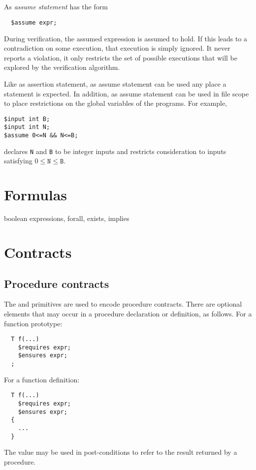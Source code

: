 \subsection{\cassume} As \emph{assume statement} has the form
\begin{verbatim}
  $assume expr;
\end{verbatim}
During verification, the assumed expression is assumed to hold.  If
this leads to a contradiction on some execution, that execution is
simply ignored.  It never reports a violation, it only restricts the
set of possible executions that will be explored by the verification
algorithm.

Like as assertion statement, as assume statement can be used any place
a statement is expected.  In addition, as assume statement can be used
in file scope to place restrictions on the global variables of the
programs.  For example,
\begin{verbatim}
$input int B;
$input int N;
$assume 0<=N && N<=B;
\end{verbatim}
declares \texttt{N} and \texttt{B} to be integer inputs and restricts
consideration to inputs satisfying $0\leq\texttt{N}\leq\texttt{B}$.


\section{Formulas}

boolean expressions, forall, exists, implies

\section{Contracts}

\subsection{Procedure contracts}
The \crequires{} and \censures{} primitives are used to encode
procedure contracts.  There are optional
elements that may occur in a procedure declaration or definition,
as follows.  For a function prototype:
\begin{verbatim}
  T f(...)
    $requires expr;
    $ensures expr;
  ;
\end{verbatim}
For a function definition:
\begin{verbatim}
  T f(...)
    $requires expr;
    $ensures expr;
  {
    ...
  }
\end{verbatim}
The value \cresult{} may be used in post-conditions to refer
to the result returned by a procedure.

